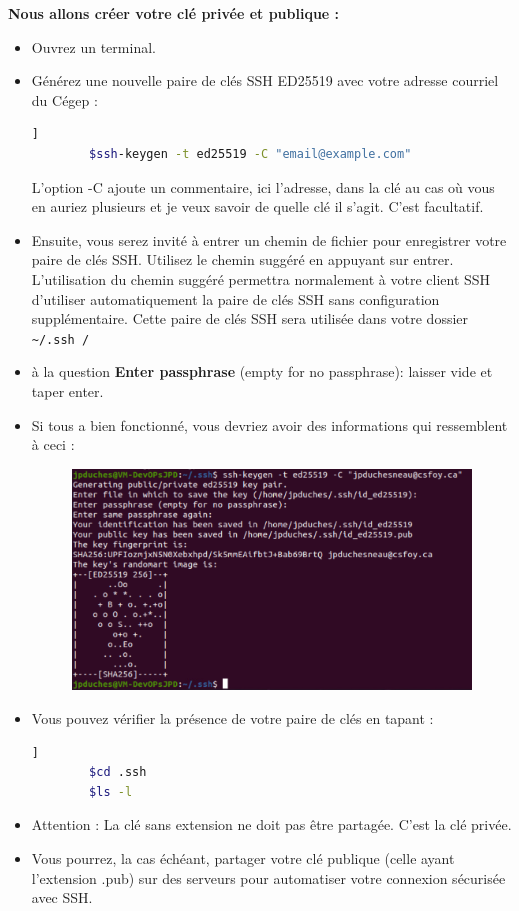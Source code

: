 	\textbf{Nous allons créer votre clé privée et publique :}
	
	\begin{itemize}
		\item Ouvrez un terminal.
		
		\item Générez une nouvelle paire de clés SSH ED25519 avec votre adresse courriel du Cégep :
		
		\begin{lstlisting}[language=bash]   ]
		$ssh-keygen -t ed25519 -C "email@example.com"
		\end{lstlisting}
		L'option -C ajoute un commentaire, ici l'adresse, dans la clé au cas où vous en auriez plusieurs et je veux savoir de quelle clé il s'agit. C'est facultatif.
		
		\item Ensuite, vous serez invité à entrer un chemin de fichier pour enregistrer votre paire de clés SSH. Utilisez le chemin suggéré en appuyant sur
		{\color{blue}entrer}. L'utilisation du chemin suggéré permettra normalement à votre client SSH
		d'utiliser automatiquement la paire de clés SSH sans configuration supplémentaire.
		Cette paire de clés SSH sera utilisée dans votre dossier 
		\verb! ~/.ssh /!
		\item à la question\textbf{ Enter passphrase} (empty for no passphrase): laisser vide et taper {\color{blue}enter}.
		\item Si tous a bien fonctionné, vous devriez  avoir des informations qui ressemblent à ceci : 
		\begin{figure}[!h]
			\centering
			\includegraphics[scale=0.6]{images/captureb2}
		\end{figure}
		\item Vous pouvez vérifier la présence de votre paire de clés en tapant :
		\begin{lstlisting}[language=bash]   ]
		$cd .ssh
		$ls -l
		\end{lstlisting}
		\item {\color{red}Attention :} La clé sans extension ne doit pas être partagée. C'est la clé privée.
		\item Vous pourrez, la cas échéant, partager votre clé publique (celle ayant l'extension .pub) sur des serveurs pour automatiser votre connexion sécurisée avec SSH.
	\end{itemize}
	
